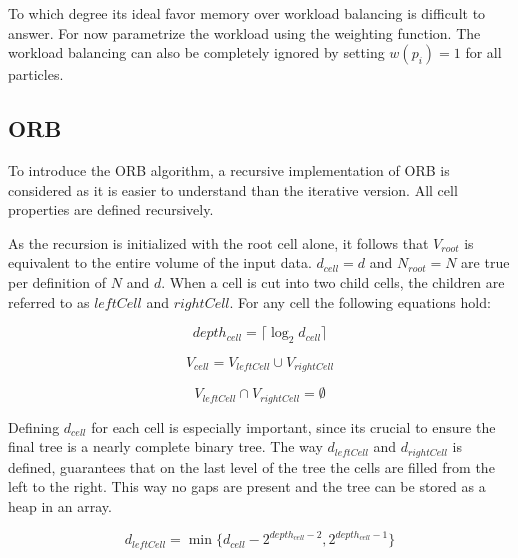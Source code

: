\documentclass[]{article}
\begin{document}
To which degree its ideal favor memory over workload balancing is difficult to answer. For now parametrize the workload using the weighting function. The workload balancing can also be completely ignored by setting $w(p_i) = 1$ for all particles.

\subsection{ORB}


To introduce the ORB algorithm, a recursive implementation of ORB is considered as it is easier to understand than the iterative version. All cell properties are defined recursively.

As the recursion is initialized with the root cell alone, it follows that $V_{root}$ is equivalent to the entire volume of the input data. $d_{cell} = d$ and $N_{root} = N$ are true per definition of $N$ and $d$. 
When a cell is cut into two child cells, the children are referred to as $leftCell$ and $rightCell$. For any cell the following equations hold:

\begin{center}
	\begin{equation} \label{eq:l}
		depth_{cell} = \lceil \log_2{d_{cell}} \rceil 
	\end{equation}
\end{center}

\begin{center}
	\begin{equation}\label{eq:v}
		V_{cell} = V_{leftCell} \cup V_{rightCell}
	\end{equation}
\end{center}

\begin{center}
	\begin{equation}\label{eq:v2}
		V_{leftCell} \cap V_{rightCell} = \emptyset
	\end{equation}
\end{center}

Defining $d_{cell}$ for each cell is especially important, since its crucial to ensure the final tree is a nearly complete binary tree. The way $d_{leftCell}$ and $d_{rightCell}$ is defined, guarantees that on the last level of the tree the cells are filled from the left to the right. This way no gaps are present and the tree can be stored as a heap in an array. 

\begin{center}
	\begin{equation} \label{eq:d1}
		d_{leftCell} = \min \{ d_{cell} - 2^{depth_{cell} -2}, 2^{depth_{cell} - 1}\}
	\end{equation}
\end{center}
\end{document}
